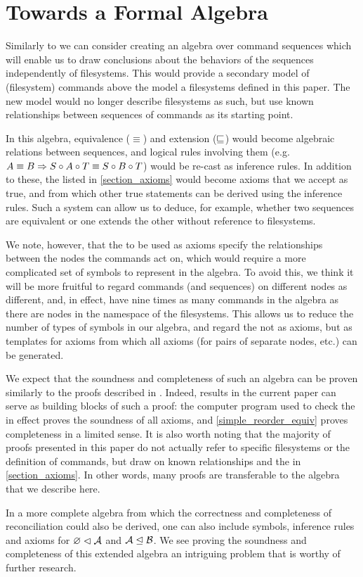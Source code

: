 
\section{Towards a Formal Algebra}\label{sec_algebra}

Similarly to \cite{NREC} we can consider creating an algebra over command sequences
which will enable us to draw conclusions about the behaviors of the sequences
independently of filesystems.
This would provide a secondary model of (filesystem) commands above the model a filesystems
defined in this paper. The new model would no longer describe filesystems as such,
but use known relationships between sequences of commands as its starting point.

In this algebra, equivalence ($\equiv$) and extension ($\sqsubseteq$) would become algebraic relations
between sequences, and logical rules involving them
(e.g. $ A\equiv B \Rightarrow S\circ A\circ T\equiv S\circ B\circ T $) would be re-cast as inference rules.
In addition to these, the  listed in \cref{section_axioms}
would become axioms that we accept as true, and from which other true statements can be derived
using the inference rules.
Such a system can allow us to deduce, for example, whether two sequences are equivalent
or one extends the other
without reference to filesystems.

We note, however, that the  to be used as axioms 
specify the relationships between the nodes
the commands act on, which would require a more complicated set of symbols to represent
in the algebra.
To avoid this, we think it will be more fruitful to regard commands (and sequences)
on different nodes as different, and, in effect, have nine times as many commands 
in the algebra as there are nodes in the namespace of the filesystems.
This allows us to reduce the number of types of symbols in our algebra, and regard
the  not as axioms, but as templates for axioms
from which all axioms (for pairs of separate nodes, etc.) can be generated.

We expect that the soundness and completeness of such an algebra can be proven
similarly to the proofs described in \cite{NREC}.
Indeed, results in the current paper can serve as building blocks of such a proof:
the computer program used to check the 
in effect proves the soundness of all axioms,
and \cref{simple_reorder_equiv} proves completeness in a limited sense.
It is also worth noting that the majority of proofs presented in this paper
do not actually refer to specific filesystems or the definition of commands,
but draw on known relationships and the
 in \cref{section_axioms}.
In other words, many proofs are transferable to the algebra that we describe here.

In a more complete algebra from which the correctness and completeness
of reconciliation could also be derived,
one can also include symbols, inference rules and axioms for 
${\varnothing}\vartriangleleft{\mathcal{A}}$ and ${\mathcal{A}}\trianglelefteq{\mathcal{B}}$.
We see proving the soundness and completeness of this extended algebra
an intriguing problem that is worthy of further research.
